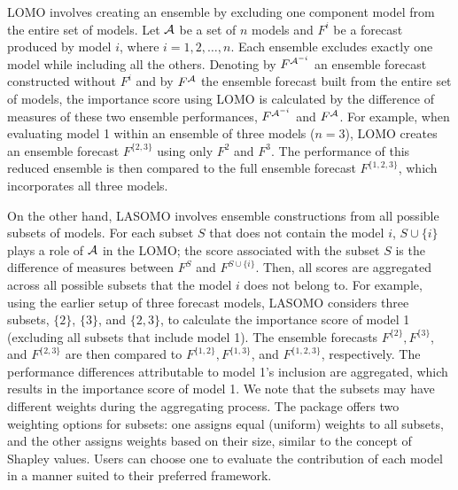 \documentclass[
  article,
  shortnames,
  notitle]{jss}
\begin{document}
LOMO involves creating an ensemble by excluding one component model from
the entire set of models. Let \({\cal A}\) be a set of \(n\) models and
\(F^i\) be a forecast produced by model \(i\), where
\(i = 1,2, \dots, n.\) Each ensemble excludes exactly one model while
including all the others. Denoting by \(F^{{\cal A}^{-i}}\) an ensemble
forecast constructed without \(F^i\) and by \(F^{\cal A}\) the ensemble
forecast built from the entire set of models, the importance score using
LOMO is calculated by the difference of measures of these two ensemble
performances, \(F^{{\cal A}^{-i}}\) and \(F^{\cal A}\). For example,
when evaluating model 1 within an ensemble of three models (\(n=3\)),
LOMO creates an ensemble forecast \(F^{\{2,3\}}\) using only \(F^2\) and
\(F^3\). The performance of this reduced ensemble is then compared to
the full ensemble forecast \(F^{\{1,2,3\}}\), which incorporates all
three models.

On the other hand, LASOMO involves ensemble constructions from all
possible subsets of models. For each subset \(S\) that does not contain
the model \(i\), \(S \cup \{i\}\) plays a role of \({\cal A}\) in the
LOMO; the score associated with the subset \(S\) is the difference of
measures between \(F^S\) and \(F^{S \cup \{i\}}\). Then, all scores are
aggregated across all possible subsets that the model \(i\) does not
belong to. For example, using the earlier setup of three forecast
models, LASOMO considers three subsets, \(\{2\}\), \(\{3\}\), and
\(\{2, 3\}\), to calculate the importance score of model 1 (excluding
all subsets that include model 1). The ensemble forecasts
\(F^{\{2\}}, F^{\{3\}}\), and \(F^{\{2,3\}}\) are then compared to
\(F^{\{1,2\}}, F^{\{1,3\}}\), and \(F^{\{1,2,3\}}\), respectively. The
performance differences attributable to model 1's inclusion are
aggregated, which results in the importance score of model 1. We note
that the subsets may have different weights during the aggregating
process. The  package offers two weighting options
for subsets: one assigns equal (uniform) weights to all subsets, and the
other assigns weights based on their size, similar to the concept of
Shapley values. Users can choose one to evaluate the contribution of
each model in a manner suited to their preferred framework.
\end{document}
